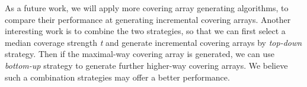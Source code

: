 \documentclass[conference]{IEEEtran}
\theoremstyle{definition}
\begin{document}
As a future work, we will apply more covering array generating algorithms, to compare their performance at generating incremental covering arrays. Another interesting work is to combine the two strategies, so that we can first select a median coverage strength \emph{t} and generate incremental covering arrays by \emph{top-down} strategy. Then if the maximal-way covering array is generated, we can use \emph{bottom-up} strategy to generate further higher-way covering arrays. We believe such a combination strategies may offer a better performance.
%
%



%
%
\end{document}
